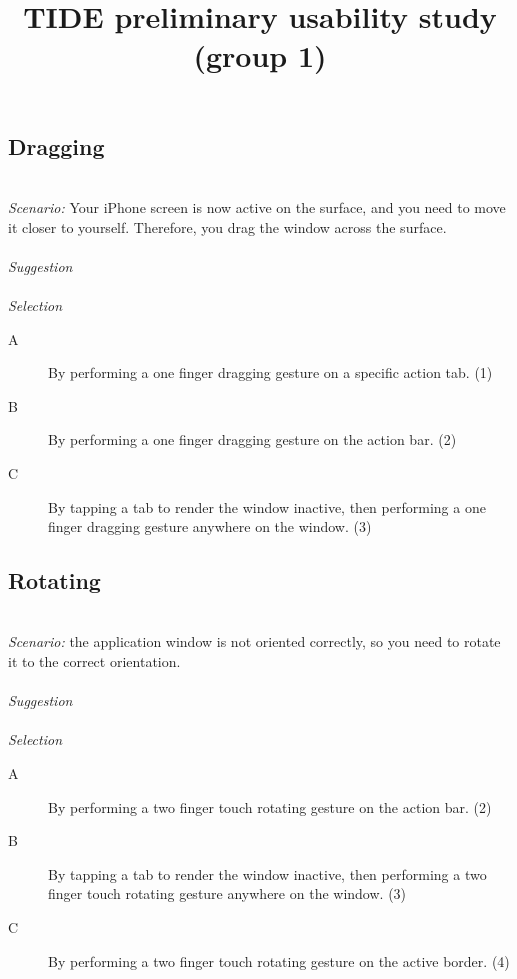 \documentclass[11pt]{amsart}
\title{TIDE preliminary usability study (group 1)}
\begin{document}
\maketitle





\subsection{Dragging}
\hfill\\
\emph{Scenario:}
Your iPhone screen is now active on the surface, and you need to move it closer to yourself. Therefore, you drag the window across the surface.
\\\\
\emph{Suggestion}
\\\\
\emph{Selection}
\begin{description}
\item[A]{By performing a one finger dragging gesture on a specific action tab. (1)}
\item[B]{By performing a one finger dragging gesture on the action bar. (2)}
\item[C]{By tapping a tab to render the window inactive, then performing a one finger dragging gesture anywhere on the window. (3)}
\end{description}


\subsection{Rotating}
\hfill\\
\emph{Scenario:}
the application window is not oriented correctly, so you need to rotate it to the correct orientation. 
\\\\
\emph{Suggestion}
\\\\
\emph{Selection}
\begin{description}
\item[A]{By performing a two finger touch rotating gesture on the action bar. (2)}
\item[B]{By tapping a tab to render the window inactive, then performing a two finger touch rotating gesture anywhere on the window. (3)}
\item[C]{By performing a two finger touch rotating gesture on the active border. (4)}
\end{description}
\end{document}
